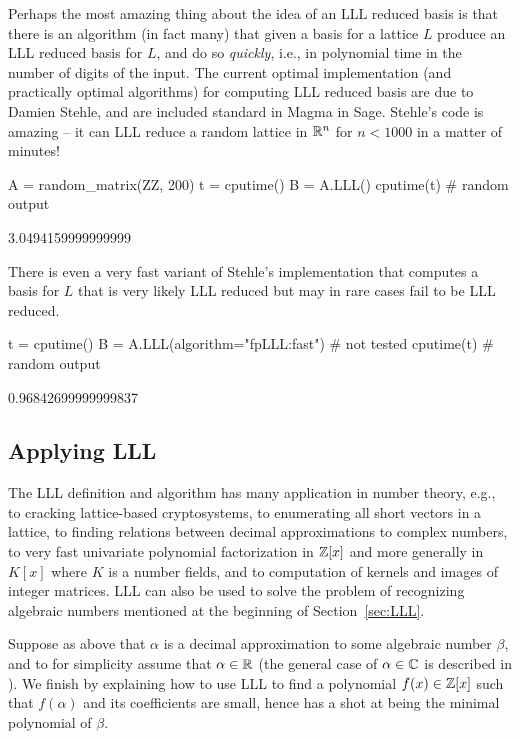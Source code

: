Perhaps the most amazing thing about the idea of an LLL
reduced basis is that there is an algorithm (in fact many)
that given a basis for a lattice $L$ produce an LLL reduced
basis for $L$, and do so {\em quickly}, i.e., in polynomial
time in the number of digits of the input.   The current
optimal implementation (and practically optimal algorithms)
for computing LLL reduced basis are due to Damien Stehle,
and are included standard in Magma in Sage.   Stehle's code
is amazing -- it can LLL reduce a random lattice in $\mathbb{R}^{n}$
for $n<1000$ in a matter of minutes!
\begin{sagecode}
\begin{sagecell}
A = random_matrix(ZZ, 200)
t = cputime()
B = A.LLL()
cputime(t)     # random output
\end{sagecell}
\begin{sageout}
3.0494159999999999
\end{sageout}
\end{sagecode}

\noindent{}There is even a very fast variant of Stehle's implementation that computes a basis for $L$ that is very likely LLL reduced but may in rare
cases fail to be LLL reduced.

\begin{sagecode}
\begin{sagecell}
t = cputime()
B = A.LLL(algorithm="fpLLL:fast")   # not tested
cputime(t)      # random output
\end{sagecell}
\begin{sageout}
0.96842699999999837
\end{sageout}
\end{sagecode}

\subsection{Applying LLL}

The LLL definition and algorithm has many application in
number theory, e.g., to cracking lattice-based cryptosystems,
to enumerating all short vectors in a lattice, to finding relations
between decimal approximations to complex numbers, to very
fast univariate polynomial factorization in $\mathbb{Z}[x]$ and more
generally in $K[x]$ where $K$ is a number fields, and to
computation of kernels and images of integer matrices.  LLL
can also be used to solve the problem of recognizing algebraic
numbers mentioned at the beginning of Section~\ref{sec:LLL}.

Suppose as above that $\alpha$ is a decimal approximation
to some algebraic number $\beta$, and to for simplicity
assume that $\alpha\in\mathbb{R}$ (the general case of $\alpha \in \mathbb{C}$
is described in \cite{cohen:course_ant}).
We finish by explaining how to use LLL to find a polynomial
$f(x) \in \mathbb{Z}[x]$ such that $f(\alpha)$ and its coefficients
are small, hence has a shot at being the minimal polynomial
of $\beta$.

